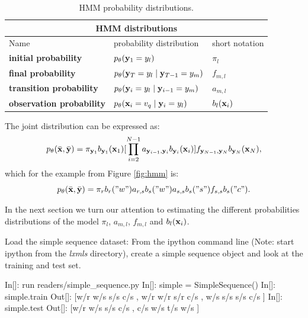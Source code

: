 \begin{table}[h]
\begin{center}
\begin{tabular}{|l|l|l|}
\hline
\multicolumn{3}{|c|}{HMM distributions}\\
\hline
Name & probability distribution & short notation \\
\hline
\textbf{initial probability} & $p_{\theta} (\mathbf{y}_1 = {y}_l)$ & $\pi_{l}$\\
\hline
\textbf{final probability} & $p_{\theta} (\mathbf{y}_T = {y}_l \mid
\mathbf{y}_{T-1} = {y}_m)$ & $f_{m,l}$\\
\hline
\textbf{transition probability} & $p_{\theta} (\mathbf{y}_i = {y}_l \mid
\mathbf{y}_{i-1} = {y}_m)$ & $a_{m,l}$\\
\hline
\textbf{observation probability} & $p_{\theta}(\mathbf{x}_i = {v}_q\mid \mathbf{y}_i = {y}_l)$ & $b_l(\mathbf{x}_i) $ \\
\hline
\end{tabular}
\end{center}
\caption[HMM probability distributions]{\label{tab:hmm-dist} HMM probability distributions.}
\end{table}

The joint distribution can be expressed as:
\begin{equation}
  p_{\theta}(\bar{\mathbf{x}} ,\bar{\mathbf{y}}) =\pi_{\mathbf{y}_1}b_{\mathbf{y}_1}(\mathbf{x}_1) [\prod_{i=2}^{N-1}
  a_{\mathbf{y}_{i-1},\mathbf{y}_{i}} b_{\mathbf{y}_{i}}(\mathbf{x}_i)] f_{\mathbf{y}_{N-1},\mathbf{y}_N}b_{\mathbf{y}_{N}}(\mathbf{x}_N),
  \label{eqn:hmm}
\end{equation}
which for the example from Figure \ref{fig:hmm} is:
\begin{equation}
  p_{\theta}(\bar{\mathbf{x}} ,\bar{\mathbf{y}}) =\pi_{r} b_r("w") a_{r,s}b_s("w") a_{s,s}b_s("s") f_{s,s}b_s("c").
  \label{eqn:hmm_ex}
\end{equation}

In the next section we turn our attention to estimating the different
probabilities distributions of the model  $\pi_l$, $a_{m,l}$,
$f_{m,l}$ and $b_l(\mathbf{x}_i)$.

\begin{exercise}
Load the simple sequence dataset:
From the ipython command line (Note: start ipython from the \emph{lxmls}
directory), create a simple sequence object and look at the training
and test set.
\begin{python}
 In[]: run readers/simple_sequence.py
 In[]: simple = SimpleSequence()
 In[]: simple.train
Out[]: [w/r w/s s/s c/s , w/r w/r s/r c/s , w/s s/s s/s c/s ]
 In[]: simple.test
Out[]: [w/r w/s s/s c/s , c/s w/s t/s w/s ] 
\end{python}
\end{exercise}
